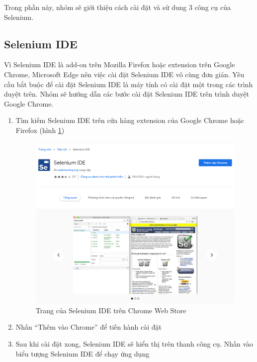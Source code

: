 \documentclass[./../main_file.tex]{subfiles}
\begin{document}
	
	Trong phần này, nhóm sẽ giới thiệu cách cài đặt và sử dung 3 công cụ của Selenium.
		
	\subsection{Selenium IDE}
	
	Vì Selenium IDE là add-on trên Mozilla Firefox hoặc extension trên Google Chrome, Microsoft Edge nên việc cài đặt Selenium IDE vô cùng đơn giản. Yêu cầu bắt buộc để cài đặt Selenium IDE là máy tính có cài đặt một trong các trình duyệt trên. Nhóm sẽ hướng dẫn các bước cài đặt Selenium IDE trên trình duyệt Google Chrome.
	
	\begin{enumerate}
		\item Tìm kiếm Selenium IDE trên cửa hàng extension của Google Chrome hoặc Firefox (hình \ref{fig:ide_chrome})
		\begin{figure}
			\includegraphics[width=\linewidth]{./images/ide_install.png}
			\caption{Trang của Selenium IDE trên Chrome Web Store}
			\label{fig:ide_chrome}
		\end{figure}
		\item Nhấn “Thêm vào Chrome” để tiến hành cài đặt %
		\item Sau khi cài đặt xong, Selenium IDE sẽ hiển thị trên thanh công cụ. Nhấn vào biểu tượng Selenium IDE để chạy ứng dụng
	\end{enumerate}
\end{document}
